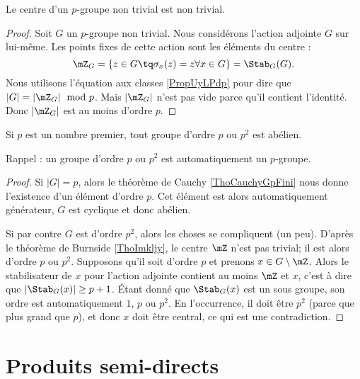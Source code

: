 \begin{theorem} \label{ThoImkljy}
    Le centre d'un \( p\)-groupe non trivial est non trivial.
\end{theorem}

\begin{proof}
    Soit \( G\) un $p$-groupe non trivial. Nous considérons l'action adjointe \( G\) sur lui-même. Les points fixes de cette action sont les éléments du centre :
    \begin{equation}
        \mZ_G=\{ z\in G\tq \sigma_x(z)=z\forall x\in G \}=\Stab_G(G).
    \end{equation}
    Nous utilisons l'équation aux classes \eqref{PropUyLPdp} pour dire que \( | G |=| \mZ_G |\mod p\). Mais \( | \mZ_G |\) n'est pas vide parce qu'il contient l'identité. Donc \( | \mZ_G |\) est au moins d'ordre \( p\).
\end{proof}

\begin{proposition} \label{PropssttFK}
    Si \( p\) est un nombre premier, tout groupe d'ordre \( p\) ou \( p^2\) est abélien.
\end{proposition}
Rappel : un groupe d'ordre \( p\) ou \( p^2\) est automatiquement un $p$-groupe.

\begin{proof}
    Si \( | G |=p\), alors le théorème de Cauchy \ref{ThoCauchyGpFini} nous donne l'existence d'un élément d'ordre \( p\). Cet élément est alors automatiquement générateur, \( G\) est cyclique et donc abélien.

    Si par contre \( G\) est d'ordre \( p^2\), alors les choses se compliquent (un peu). D'après le théorème de Burnside \ref{ThoImkljy}, le centre \( \mZ\) n'est pas trivial; il est alors d'ordre \( p\) ou \( p^2\). Supposons qu'il soit d'ordre \( p\) et prenons \( x\in G\setminus\mZ\). Alors le stabilisateur de \( x\) pour l'action adjointe contient au moins \( \mZ\) et \( x\), c'est à dire que \( |\Stab_G(x)|\geq p+1\). Étant donné que \( \Stab_G(x)\) est un sous groupe, son ordre est automatiquement \( 1\), \( p\) ou \( p^2\). En l'occurrence, il doit être \( p^2\) (parce que plus grand que \( p\)), et donc \( x\) doit être central, ce qui est une contradiction.
\end{proof}

\section{Produits semi-directs}


